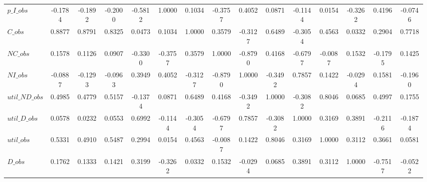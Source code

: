 \begin{center}
\begin{longtable}{lcccccccccccccc}
$p\_I\_obs      $	 & 	          -0.1784	 & 	          -0.1892	 & 	          -0.2000	 & 	          -0.5812	 & 	           1.0000	 & 	           0.1034	 & 	          -0.3757	 & 	           0.4052	 & 	           0.0871	 & 	          -0.1144	 & 	           0.0154	 & 	          -0.3262	 & 	           0.4196	 & 	          -0.0746 \\ 
$C\_obs         $	 & 	           0.8877	 & 	           0.8791	 & 	           0.8325	 & 	           0.0473	 & 	           0.1034	 & 	           1.0000	 & 	           0.3579	 & 	          -0.3127	 & 	           0.6489	 & 	          -0.3054	 & 	           0.4563	 & 	           0.0332	 & 	           0.2904	 & 	           0.7718 \\ 
$NC\_obs        $	 & 	           0.1578	 & 	           0.1126	 & 	           0.0907	 & 	          -0.3300	 & 	          -0.3757	 & 	           0.3579	 & 	           1.0000	 & 	          -0.8790	 & 	           0.4168	 & 	          -0.6797	 & 	          -0.0087	 & 	           0.1532	 & 	          -0.1795	 & 	           0.1425 \\ 
$NI\_obs        $	 & 	          -0.0887	 & 	          -0.1293	 & 	          -0.0963	 & 	           0.3949	 & 	           0.4052	 & 	          -0.3127	 & 	          -0.8790	 & 	           1.0000	 & 	          -0.3492	 & 	           0.7857	 & 	           0.1422	 & 	          -0.0294	 & 	           0.1581	 & 	          -0.1960 \\ 
$util\_ND\_obs  $	 & 	           0.4985	 & 	           0.4779	 & 	           0.5157	 & 	          -0.1374	 & 	           0.0871	 & 	           0.6489	 & 	           0.4168	 & 	          -0.3492	 & 	           1.0000	 & 	          -0.3082	 & 	           0.8046	 & 	           0.0685	 & 	           0.4997	 & 	           0.1755 \\ 
$util\_D\_obs   $	 & 	           0.0578	 & 	           0.0232	 & 	           0.0553	 & 	           0.6992	 & 	          -0.1144	 & 	          -0.3054	 & 	          -0.6797	 & 	           0.7857	 & 	          -0.3082	 & 	           1.0000	 & 	           0.3169	 & 	           0.3891	 & 	          -0.2116	 & 	          -0.1874 \\ 
$util\_obs      $	 & 	           0.5331	 & 	           0.4910	 & 	           0.5487	 & 	           0.2994	 & 	           0.0154	 & 	           0.4563	 & 	          -0.0087	 & 	           0.1422	 & 	           0.8046	 & 	           0.3169	 & 	           1.0000	 & 	           0.3112	 & 	           0.3661	 & 	           0.0581 \\ 
$D\_obs         $	 & 	           0.1762	 & 	           0.1333	 & 	           0.1421	 & 	           0.3199	 & 	          -0.3262	 & 	           0.0332	 & 	           0.1532	 & 	          -0.0294	 & 	           0.0685	 & 	           0.3891	 & 	           0.3112	 & 	           1.0000	 & 	          -0.7517	 & 	          -0.0522 \\ 

\end{longtable}
\end{center}
